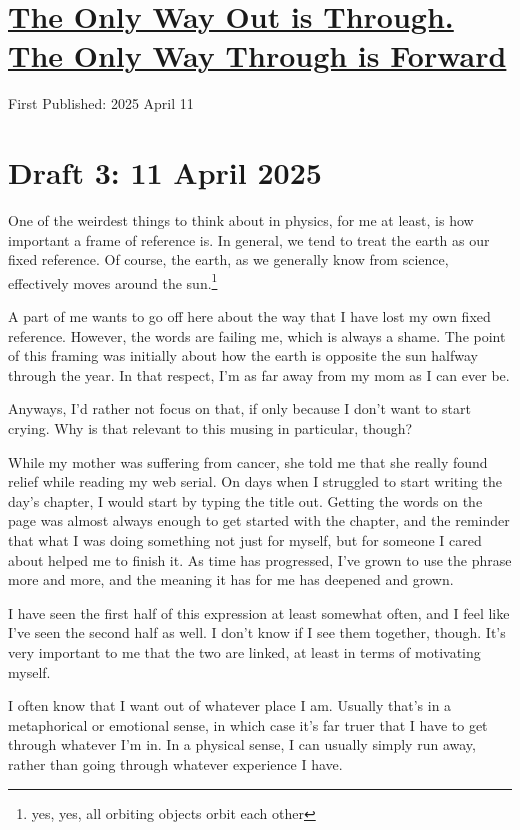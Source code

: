 \documentclass[12pt]{article}
\renewcommand{\,}{\textsuperscript{,}}
\begin{document}
  
\doublespacing  
\section{\href{out-through-forward.html}{The Only Way Out is Through. The Only Way Through is Forward}}  
First Published: 2025 April 11

\section{Draft 3: 11 April 2025}

One of the weirdest things to think about in physics, for me at least, is how important a frame of reference is.  
In general, we tend to treat the earth as our fixed reference.  
Of course, the earth, as we generally know from science, effectively moves around the sun.\footnote{yes, yes, all orbiting objects orbit each other}

A part of me wants to go off here about the way that I have lost my own fixed reference.  
However, the words are failing me, which is always a shame.  
The point of this framing was initially about how the earth is opposite the sun halfway through the year.  
In that respect, I'm as far away from my mom as I can ever be.

Anyways, I'd rather not focus on that, if only because I don't want to start crying.  
Why is that relevant to this musing in particular, though?

While my mother was suffering from cancer, she told me that she really found relief while reading my web serial.  
On days when I struggled to start writing the day's chapter, I would start by typing the title out.  
Getting the words on the page was almost always enough to get started with the chapter, and the reminder that what I was doing something not just for myself, but for someone I cared about helped me to finish it.  
As time has progressed, I've grown to use the phrase more and more, and the meaning it has for me has deepened and grown.

I have seen the first half of this expression at least somewhat often, and I feel like I've seen the second half as well.  
I don't know if I see them together, though.  
It's very important to me that the two are linked, at least in terms of motivating myself.

I often know that I want out of whatever place I am.  
Usually that's in a metaphorical or emotional sense, in which case it's far truer that I have to get through whatever I'm in.  
In a physical sense, I can usually simply run away, rather than going through whatever experience I have.
\end{document}
